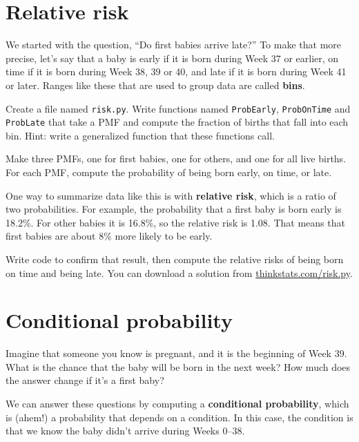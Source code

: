 \documentclass[12pt]{book}
\begin{document}
\section{Relative risk}
\label{relative.risk}

We started with the question, ``Do first babies arrive late?''  To
make that more precise, let's say that a baby is early if it is born
during Week 37 or earlier, on time if it is born during Week 38, 39 or
40, and late if it is born during Week 41 or later.  Ranges like these
that are used to group data are called {\bf bins}.

\begin{exercise}
Create a file named {\tt risk.py}.
Write functions named {\tt ProbEarly}, {\tt ProbOnTime} and
{\tt ProbLate} that take a PMF and compute the fraction of births
that fall into each bin.  Hint: write a generalized function
that these functions call.

Make three PMFs, one for first babies, one for others, and one for
all live births.  For each PMF, compute the probability of being
born early, on time, or late.

One way to summarize data like this is with {\bf relative risk},
which is a ratio of two probabilities.  For example, the probability
that a first baby is born early is 18.2\%.  For other babies it is
16.8\%, so the relative risk is 1.08.  That means that first babies
are about 8\% more likely to be early.

Write code to confirm that result, then compute the relative risks of
being born on time and being late.  You can download a solution
from \url{thinkstats.com/risk.py}.

\end{exercise}


\section{Conditional probability}

Imagine that someone you know is pregnant, and it is the beginning of
Week 39.  What is the chance that the baby will be born in the next
week?  How much does the answer change if it's a first baby?

We can answer these questions by computing a {\bf conditional
probability}, which is (ahem!) a probability that depends on a condition.
In this case, the condition is that we know the baby didn't arrive
during Weeks 0--38.
\end{document}
